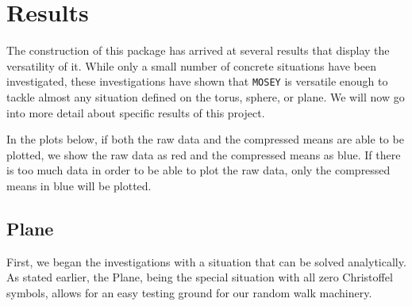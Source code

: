 \documentclass{article}
\begin{document}
\section{Results}
	The construction of this package has arrived at several results that display the versatility of it.
	While only a small number of concrete situations have been investigated, these investigations have shown that \texttt{MOSEY} is versatile enough to tackle almost any situation defined on the torus, sphere, or plane.
	We will now go into more detail about specific results of this project.
	
	In the plots below, if both the raw data and the compressed means are able to be plotted, we show the raw data as red and the compressed means as blue.
	If there is too much data in order to be able to plot the raw data, only the compressed means in blue will be plotted.
	
	\subsection{Plane}
		First, we began the investigations with a situation that can be solved analytically.
		As stated earlier, the Plane, being the special situation with all zero Christoffel symbols, allows for an easy testing ground for our random walk machinery.
		
\end{document}
